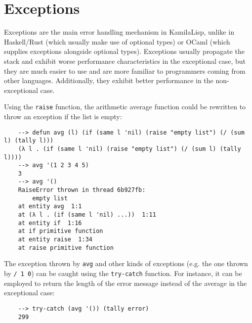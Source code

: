 \section{Exceptions}

Exceptions are the main error handling mechanism in KamilaLisp, unlike in Haskell/Rust (which usually make use of optional types) or OCaml (which supplies exceptions alongside optional types). Exceptions usually propagate the stack and exhibit worse performance characteristics in the exceptional case, but they are much easier to use and are more familiar to programmers coming from other languages. Additionally, they exhibit better performance in the non-exceptional case.

Using the \verb|raise| function, the arithmetic average function could be rewritten to throw an exception if the list is empty:

\begin{Verbatim}
    --> defun avg (l) (if (same l 'nil) (raise "empty list") (/ (sum l) (tally l)))
    (λ l . (if (same l 'nil) (raise "empty list") (/ (sum l) (tally l))))
    --> avg '(1 2 3 4 5)
    3
    --> avg '()
    RaiseError thrown in thread 6b927fb:
        empty list
    at entity avg  1:1
    at (λ l . (if (same l 'nil) ...))  1:11
    at entity if  1:16
    at if primitive function
    at entity raise  1:34
    at raise primitive function
\end{Verbatim}

The exception thrown by \verb|avg| and other kinds of exceptions (e.g. the one thrown by \verb|/ 1 0|) can be caught using the \verb|try-catch| function. For instance, it can be employed to return the length of the error message instead of the average in the exceptional case:

\begin{Verbatim}
    --> try-catch (avg '()) (tally error)
    299
\end{Verbatim}
